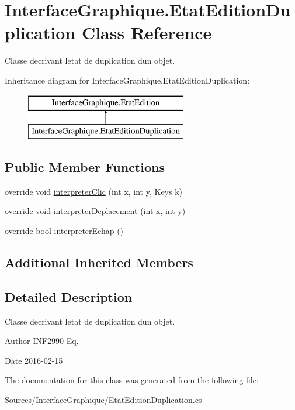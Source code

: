 \hypertarget{class_interface_graphique_1_1_etat_edition_duplication}{}\section{Interface\+Graphique.\+Etat\+Edition\+Duplication Class Reference}
\label{class_interface_graphique_1_1_etat_edition_duplication}


Classe decrivant l\textquotesingle{}etat de duplication d\textquotesingle{}un objet.  


Inheritance diagram for Interface\+Graphique.\+Etat\+Edition\+Duplication\+:\begin{figure}[H]
\begin{center}
\leavevmode
\includegraphics[height=2.000000cm]{class_interface_graphique_1_1_etat_edition_duplication}
\end{center}
\end{figure}
\subsection*{Public Member Functions}
\begin{DoxyCompactItemize}
\item 
override void \hyperlink{group__inf2990_ga798fb4efadd7939ccf925d0aafb70492}{interpreter\+Clic} (int x, int y, Keys k)
\item 
override void \hyperlink{group__inf2990_gab2a60a3e707358497925df99b483cae0}{interpreter\+Deplacement} (int x, int y)
\item 
override bool \hyperlink{group__inf2990_gad2a0ed82508e947c24ffe99b78280b63}{interpreter\+Echap} ()
\end{DoxyCompactItemize}
\subsection*{Additional Inherited Members}


\subsection{Detailed Description}
Classe decrivant l\textquotesingle{}etat de duplication d\textquotesingle{}un objet. 

\begin{DoxyAuthor}{Author}
I\+N\+F2990 Eq. 
\end{DoxyAuthor}
\begin{DoxyDate}{Date}
2016-\/02-\/15 
\end{DoxyDate}


The documentation for this class was generated from the following file\+:\begin{DoxyCompactItemize}
\item 
Sources/\+Interface\+Graphique/\hyperlink{_etat_edition_duplication_8cs}{Etat\+Edition\+Duplication.\+cs}\end{DoxyCompactItemize}
